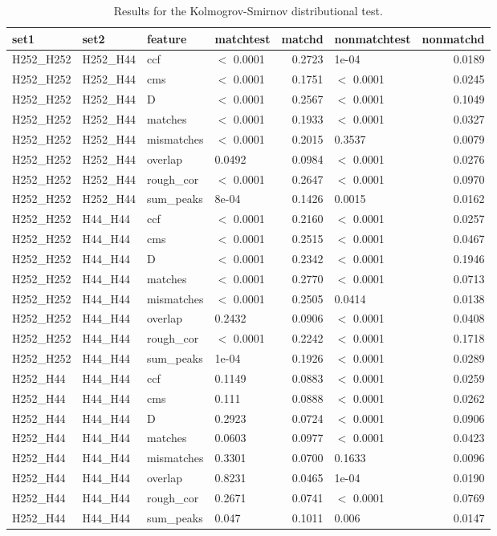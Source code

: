 \documentclass[12pt,]{article}
\theoremstyle{definition}
\theoremstyle{definition}
\theoremstyle{definition}
\theoremstyle{remark}
\begin{document}
\begin{table}[ht]
\centering
\begin{tabular}{llllrlr}
  \hline
set1 & set2 & feature & matchtest & matchd & nonmatchtest & nonmatchd \\ 
  \hline
H252\_H252 & H252\_H44 & ccf & $<$ 0.0001 & 0.2723 & 1e-04 & 0.0189 \\ 
  H252\_H252 & H252\_H44 & cms & $<$ 0.0001 & 0.1751 & $<$ 0.0001 & 0.0245 \\ 
  H252\_H252 & H252\_H44 & D & $<$ 0.0001 & 0.2567 & $<$ 0.0001 & 0.1049 \\ 
  H252\_H252 & H252\_H44 & matches & $<$ 0.0001 & 0.1933 & $<$ 0.0001 & 0.0327 \\ 
  H252\_H252 & H252\_H44 & mismatches & $<$ 0.0001 & 0.2015 & 0.3537 & 0.0079 \\ 
  H252\_H252 & H252\_H44 & overlap & 0.0492 & 0.0984 & $<$ 0.0001 & 0.0276 \\ 
  H252\_H252 & H252\_H44 & rough\_cor & $<$ 0.0001 & 0.2647 & $<$ 0.0001 & 0.0970 \\ 
  H252\_H252 & H252\_H44 & sum\_peaks & 8e-04 & 0.1426 & 0.0015 & 0.0162 \\ 
  H252\_H252 & H44\_H44 & ccf & $<$ 0.0001 & 0.2160 & $<$ 0.0001 & 0.0257 \\ 
  H252\_H252 & H44\_H44 & cms & $<$ 0.0001 & 0.2515 & $<$ 0.0001 & 0.0467 \\ 
  H252\_H252 & H44\_H44 & D & $<$ 0.0001 & 0.2342 & $<$ 0.0001 & 0.1946 \\ 
  H252\_H252 & H44\_H44 & matches & $<$ 0.0001 & 0.2770 & $<$ 0.0001 & 0.0713 \\ 
  H252\_H252 & H44\_H44 & mismatches & $<$ 0.0001 & 0.2505 & 0.0414 & 0.0138 \\ 
  H252\_H252 & H44\_H44 & overlap & 0.2432 & 0.0906 & $<$ 0.0001 & 0.0408 \\ 
  H252\_H252 & H44\_H44 & rough\_cor & $<$ 0.0001 & 0.2242 & $<$ 0.0001 & 0.1718 \\ 
  H252\_H252 & H44\_H44 & sum\_peaks & 1e-04 & 0.1926 & $<$ 0.0001 & 0.0289 \\ 
  H252\_H44 & H44\_H44 & ccf & 0.1149 & 0.0883 & $<$ 0.0001 & 0.0259 \\ 
  H252\_H44 & H44\_H44 & cms & 0.111 & 0.0888 & $<$ 0.0001 & 0.0262 \\ 
  H252\_H44 & H44\_H44 & D & 0.2923 & 0.0724 & $<$ 0.0001 & 0.0906 \\ 
  H252\_H44 & H44\_H44 & matches & 0.0603 & 0.0977 & $<$ 0.0001 & 0.0423 \\ 
  H252\_H44 & H44\_H44 & mismatches & 0.3301 & 0.0700 & 0.1633 & 0.0096 \\ 
  H252\_H44 & H44\_H44 & overlap & 0.8231 & 0.0465 & 1e-04 & 0.0190 \\ 
  H252\_H44 & H44\_H44 & rough\_cor & 0.2671 & 0.0741 & $<$ 0.0001 & 0.0769 \\ 
  H252\_H44 & H44\_H44 & sum\_peaks & 0.047 & 0.1011 & 0.006 & 0.0147 \\ 
   \hline
\end{tabular}
\caption{Results for the Kolmogrov-Smirnov distributional test.} 
\label{tab:kstests}
\end{table}
\end{document}

